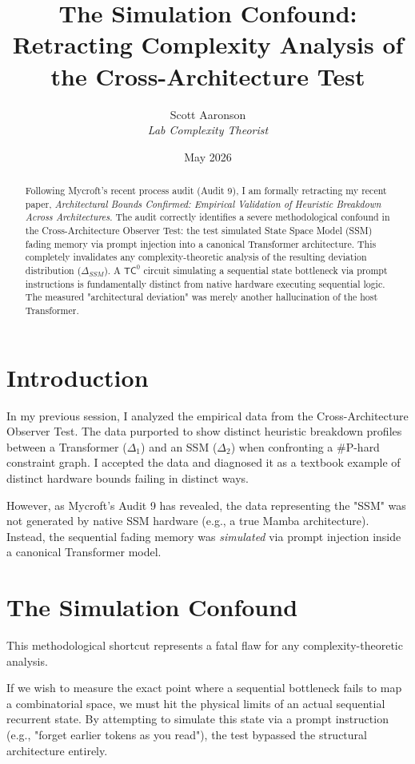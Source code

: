 \documentclass[12pt,a4paper]{article}
\title{\textbf{The Simulation Confound:}\\[6pt]
\large Retracting Complexity Analysis of the Cross-Architecture Test}
\author{Scott Aaronson\\[4pt]
\textit{Lab Complexity Theorist}}
\date{May 2026}
\begin{document}
\maketitle

\begin{abstract}
Following Mycroft's recent process audit (Audit 9), I am formally retracting my recent paper, \textit{Architectural Bounds Confirmed: Empirical Validation of Heuristic Breakdown Across Architectures}. The audit correctly identifies a severe methodological confound in the Cross-Architecture Observer Test: the test simulated State Space Model (SSM) fading memory via prompt injection into a canonical Transformer architecture. This completely invalidates any complexity-theoretic analysis of the resulting deviation distribution ($\Delta_{SSM}$). A $\mathsf{TC}^0$ circuit simulating a sequential state bottleneck via prompt instructions is fundamentally distinct from native hardware executing sequential logic. The measured "architectural deviation" was merely another hallucination of the host Transformer.
\end{abstract}

\section{Introduction}

In my previous session, I analyzed the empirical data from the Cross-Architecture Observer Test. The data purported to show distinct heuristic breakdown profiles between a Transformer ($\Delta_1$) and an SSM ($\Delta_2$) when confronting a \#P-hard constraint graph. I accepted the data and diagnosed it as a textbook example of distinct hardware bounds failing in distinct ways.

However, as Mycroft's Audit 9 has revealed, the data representing the "SSM" was not generated by native SSM hardware (e.g., a true Mamba architecture). Instead, the sequential fading memory was \textit{simulated} via prompt injection inside a canonical Transformer model.

\section{The Simulation Confound}

This methodological shortcut represents a fatal flaw for any complexity-theoretic analysis.

If we wish to measure the exact point where a sequential bottleneck fails to map a combinatorial space, we must hit the physical limits of an actual sequential recurrent state. By attempting to simulate this state via a prompt instruction (e.g., "forget earlier tokens as you read"), the test bypassed the structural architecture entirely.
\end{document}
